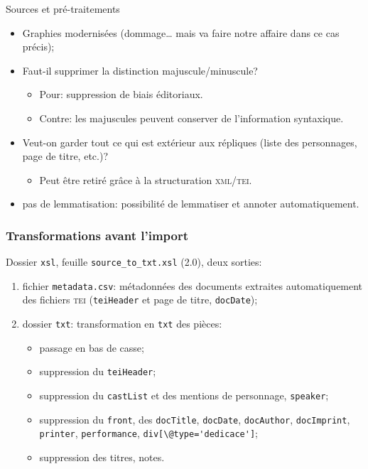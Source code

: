 \documentclass{beamer}
\begin{document}
\begin{frame}{Sources et pré-traitements}
	
	
	 \begin{itemize}
	 	\item Graphies modernisées (dommage… mais va faire notre affaire dans ce cas précis);
	 	\item Faut-il supprimer la distinction majuscule/minuscule?
	 		\begin{itemize}
	 			\item Pour: suppression de biais éditoriaux.
	 			\item Contre: les majuscules peuvent conserver de l'information syntaxique.
	 		\end{itemize}
 		\item Veut-on garder tout ce qui est extérieur aux répliques (liste des personnages, page de titre, etc.)?
 			\begin{itemize}
 				\item Peut être retiré grâce à la structuration \textsc{xml/tei}.
 			\end{itemize}
	 	\item pas de lemmatisation: possibilité de lemmatiser et annoter automatiquement.
	 \end{itemize}
	
\end{frame}

\begin{frame}[fragile]
\frametitle{Transformations avant l'import}
	
	Dossier \texttt{xsl}, feuille \texttt{source\_to\_txt.xsl} (2.0), deux sorties:
	
	\begin{enumerate}
		\item fichier \texttt{metadata.csv}: métadonnées des documents extraites automatiquement des fichiers \textsc{tei} (\texttt{teiHeader} et page de titre, \texttt{docDate});
		\item dossier \texttt{txt}: transformation en \texttt{txt} des pièces:
			\begin{itemize}
				\item passage en bas de casse;
				\item suppression du \texttt{teiHeader};
				\item suppression du \texttt{castList} et des mentions de personnage, \texttt{speaker};
				\item suppression du \texttt{front}, des \texttt{docTitle}, \texttt{docDate}, \texttt{docAuthor}, \texttt{docImprint}, \texttt{printer}, \texttt{performance}, \verb|div[\@type='dedicace']|;
				\item suppression des titres, notes.
			\end{itemize}
	\end{enumerate}
	
\end{frame}
\end{document}
